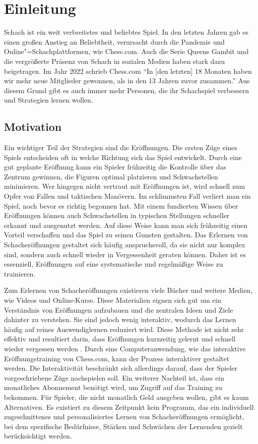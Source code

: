 
\chapter{Einleitung}

Schach ist ein weit verbreitetes und beliebtes Spiel. In den letzten Jahren gab es einen großen Anstieg an Beliebtheit, verursacht durch die Pandemie und Online"=Schachplattformen, wie Chess.com. Auch die Serie Queens Gambit und die vergrößerte Präsenz von Schach in sozialen Medien haben stark dazu beigetragen. Im Jahr 2022 schrieb Chess.com\: \enquote{In [den letzten] 18 Monaten haben wir mehr neue Mitglieder gewonnen, als in den 13 Jahren zuvor zusammen.} \cite{chesscom_chesscom_2022}
Aus diesem Grund gibt es auch immer mehr Personen, die ihr Schachspiel verbessern und Strategien lernen wollen.

\section{Motivation}
Ein wichtiger Teil der Strategien sind die Eröffnungen. Die ersten Züge eines Spiels entscheiden oft in welche Richtung sich das Spiel entwickelt. Durch eine gut geplante Eröffnung kann ein Spieler frühzeitig die Kontrolle über das Zentrum gewinnen, die Figuren optimal platzieren und Schwachstellen minimieren. Wer hingegen nicht vertraut mit Eröffnungen ist, wird schnell zum Opfer von Fallen und taktischen Manövern. Im schlimmsten Fall verliert man ein Spiel, noch bevor es richtig begonnen hat. Mit einem fundierten Wissen über Eröffnungen können auch Schwachstellen in typischen Stellungen schneller erkannt und ausgenutzt werden. Auf diese Weise kann man sich frühzeitig einen Vorteil verschaffen und das Spiel zu seinen Gunsten gestalten. Das Erlernen von Schacheröffnungen gestaltet sich häufig anspruchsvoll, da sie nicht nur komplex sind, sondern auch schnell wieder in Vergessenheit geraten können. Daher ist es essenziell, Eröffnungen auf eine systematische und regelmäßige Weise zu trainieren.

Zum Erlernen von Schacheröffnungen existieren viele Bücher und weitere Medien, wie Videos und Online-Kurse. Diese Materialien eignen sich gut um ein Verständnis von Eröffnungen aufzubauen und die zentralen Ideen und Ziele dahinter zu verstehen.
Sie sind jedoch wenig interaktiv, wodurch das Lernen häufig auf reines Auswendiglernen reduziert wird.
Diese Methode ist nicht sehr effektiv und resultiert darin, dass Eröffnungen kurzzeitig gelernt und schnell wieder vergessen werden \cite{gobet_training_2006}. Durch eine Computeranwendung, wie das interaktive Eröffnungstraining von Chess.com, kann der Prozess interaktiver gestaltet werden. Die Interaktivität beschränkt sich allerdings darauf, dass der Spieler vorgeschriebene Züge nachspielen soll. Ein weiterer Nachteil ist, dass ein monatliches Abonnement benötigt wird, um Zugriff auf das Training zu bekommen. Für Spieler, die nicht monatlich Geld ausgeben wollen, gibt es kaum Alternativen.
Es existiert zu diesem Zeitpunkt kein Programm, das ein individuell zugeschnittenes und personalisiertes Lernen von Schacheröffnungen ermöglicht, bei dem spezifische Bedürfnisse, Stärken und Schwächen der Lernenden gezielt berücksichtigt werden.

